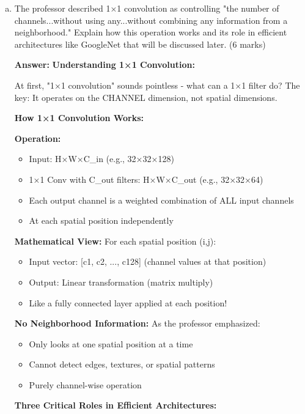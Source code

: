 \documentclass[12pt]{article}
\newcommand{\answer}[1]{{\color{answercolor}\textbf{Answer:} #1}}
\newcommand{\explanation}[1]{{\color{explanationcolor}#1}}
\begin{document}
\begin{enumerate}[(a)]
    \item The professor described 1×1 convolution as controlling "the number of channels...without using any...without combining any information from a neighborhood." Explain how this operation works and its role in efficient architectures like GoogleNet that will be discussed later. \hfill (6 marks)
    
    \answer{
    \textbf{Understanding 1×1 Convolution:}
    
    \explanation{
    At first, "1×1 convolution" sounds pointless - what can a 1×1 filter do?
    The key: It operates on the CHANNEL dimension, not spatial dimensions.
    }
    
    \textbf{How 1×1 Convolution Works:}
    
    \explanation{
    \textbf{Operation:}
    \begin{itemize}
        \item Input: H×W×C_in (e.g., 32×32×128)
        \item 1×1 Conv with C_out filters: H×W×C_out (e.g., 32×32×64)
        \item Each output channel is a weighted combination of ALL input channels
        \item At each spatial position independently
    \end{itemize}
    
    \textbf{Mathematical View:}
    For each spatial position (i,j):
    \begin{itemize}
        \item Input vector: [c1, c2, ..., c128] (channel values at that position)
        \item Output: Linear transformation (matrix multiply)
        \item Like a fully connected layer applied at each position!
    \end{itemize}
    
    \textbf{No Neighborhood Information:}
    As the professor emphasized:
    \begin{itemize}
        \item Only looks at one spatial position at a time
        \item Cannot detect edges, textures, or spatial patterns
        \item Purely channel-wise operation
    \end{itemize}
    }
    
    \textbf{Three Critical Roles in Efficient Architectures:}
    
}
\end{enumerate}
\end{document}
